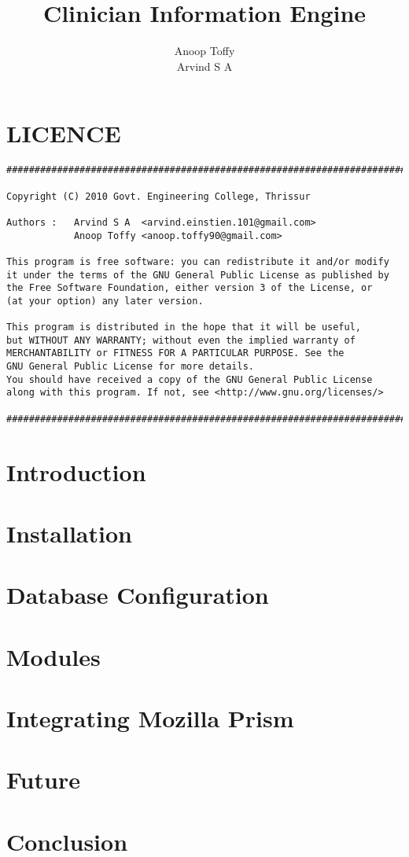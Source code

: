 \documentclass[10pt,a4paper]{article}
\title{Clinician Information Engine}
\author{Anoop Toffy \\ Arvind S A \vspace*{14cm}}
\begin{document}
\maketitle
\newpage
\tableofcontents
\newpage

\section*{LICENCE}
\vspace*{5cm}
\begin{verbatim}
##########################################################################

Copyright (C) 2010 Govt. Engineering College, Thrissur

Authors : 	Arvind S A  <arvind.einstien.101@gmail.com>
			Anoop Toffy <anoop.toffy90@gmail.com>

This program is free software: you can redistribute it and/or modify
it under the terms of the GNU General Public License as published by
the Free Software Foundation, either version 3 of the License, or
(at your option) any later version.

This program is distributed in the hope that it will be useful,
but WITHOUT ANY WARRANTY; without even the implied warranty of
MERCHANTABILITY or FITNESS FOR A PARTICULAR PURPOSE. See the
GNU General Public License for more details.
You should have received a copy of the GNU General Public License
along with this program. If not, see <http://www.gnu.org/licenses/>

##########################################################################

\end{verbatim}
\newpage
\section{Introduction}
\newpage
\section{Installation}
\newpage
\section{Database Configuration}
\newpage
\section{Modules}
\newpage
\section{Integrating Mozilla Prism}
\newpage
\section{Future}
\newpage
\section{Conclusion}
\end{document}
